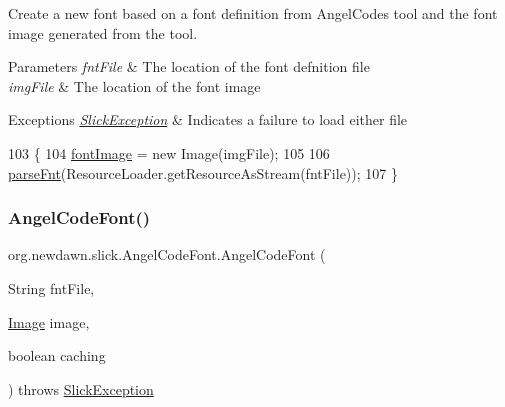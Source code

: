 Create a new font based on a font definition from Angel\+Code\textquotesingle{}s tool and the font image generated from the tool.


\begin{DoxyParams}{Parameters}
{\em fnt\+File} & The location of the font defnition file \\
\hline
{\em img\+File} & The location of the font image \\
\hline
\end{DoxyParams}

\begin{DoxyExceptions}{Exceptions}
{\em \mbox{\hyperlink{classorg_1_1newdawn_1_1slick_1_1_slick_exception}{Slick\+Exception}}} & Indicates a failure to load either file \\
\hline
\end{DoxyExceptions}

\begin{DoxyCode}
103                                                                                \{
104         \mbox{\hyperlink{classorg_1_1newdawn_1_1slick_1_1_angel_code_font_a891bf3b2a299313dc4f37c3808982aba}{fontImage}} = \textcolor{keyword}{new} Image(imgFile);
105 
106         \mbox{\hyperlink{classorg_1_1newdawn_1_1slick_1_1_angel_code_font_a8950d304cfa460c9d2755900abda6c02}{parseFnt}}(ResourceLoader.getResourceAsStream(fntFile));
107     \}
\end{DoxyCode}
\mbox{\label{classorg_1_1newdawn_1_1slick_1_1_angel_code_font_a99a224bebb26190c9a63dc137e244c2d}} 
\subsubsection{\texorpdfstring{Angel\+Code\+Font()}{AngelCodeFont()}\hspace{0.1cm}{\footnotesize\ttfamily [3/6]}}
{\footnotesize\ttfamily org.\+newdawn.\+slick.\+Angel\+Code\+Font.\+Angel\+Code\+Font (\begin{DoxyParamCaption}\item[{String}]{fnt\+File,  }\item[{\mbox{\hyperlink{classorg_1_1newdawn_1_1slick_1_1_image}{Image}}}]{image,  }\item[{boolean}]{caching }\end{DoxyParamCaption}) throws \mbox{\hyperlink{classorg_1_1newdawn_1_1slick_1_1_slick_exception}{Slick\+Exception}}\hspace{0.3cm}{\ttfamily [inline]}}

